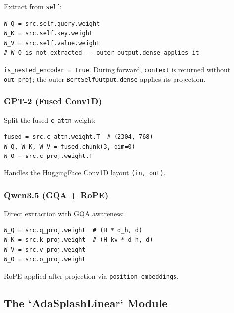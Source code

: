 Extract from \texttt{self}:

\begin{lstlisting}
W_Q = src.self.query.weight
W_K = src.self.key.weight
W_V = src.self.value.weight
# W_O is not extracted -- outer output.dense applies it
\end{lstlisting}

\texttt{is\_nested\_encoder = True}. During forward, \texttt{context} is returned without 
\texttt{out\_proj}; the outer \texttt{BertSelfOutput.dense} applies its projection.

\subsubsection{GPT-2 (Fused Conv1D)}

Split the fused \texttt{c\_attn} weight:

\begin{lstlisting}
fused = src.c_attn.weight.T  # (2304, 768)
W_Q, W_K, W_V = fused.chunk(3, dim=0)
W_O = src.c_proj.weight.T
\end{lstlisting}

Handles the HuggingFace Conv1D layout \texttt{(in, out)}.

\subsubsection{Qwen3.5 (GQA + RoPE)}

Direct extraction with GQA awareness:

\begin{lstlisting}
W_Q = src.q_proj.weight  # (H * d_h, d)
W_K = src.k_proj.weight  # (H_kv * d_h, d)
W_V = src.v_proj.weight
W_O = src.o_proj.weight
\end{lstlisting}

RoPE applied after projection via \texttt{position\_embeddings}.

\subsection{The `AdaSplashLinear` Module}

